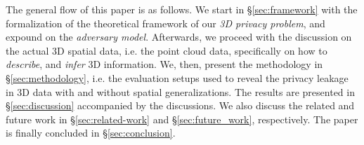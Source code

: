 The general flow of this paper is as follows. We start in \S\ref{sec:framework} with the formalization of the theoretical framework of our \textit{3D privacy problem}, and expound on the \textit{adversary model}. Afterwards, we proceed with the discussion on the actual 3D spatial data, i.e. the point cloud data, specifically on how to \textit{describe}, and \textit{infer} 3D information. We, then, present the methodology in \S\ref{sec:methodology}, i.e. the evaluation setups used to reveal the privacy leakage in 3D data with and without spatial generalizations. The results are presented in \S\ref{sec:discussion} accompanied by the discussions. We also discuss the related and future work in \S\ref{sec:related-work} and \S\ref{sec:future_work}, respectively. The paper is finally concluded in \S\ref{sec:conclusion}.




